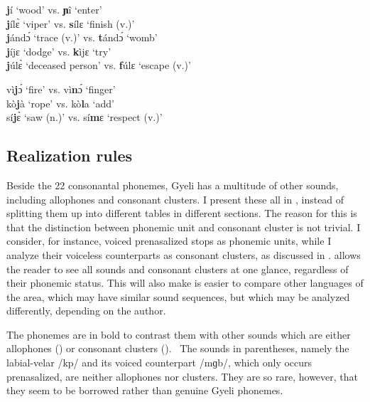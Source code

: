 \ea \label{j}
{\bfseries j}í `wood' vs. {\bfseries ɲ}î `enter' \\
{\bfseries j}ílɛ̀ `viper' vs. {\bfseries s}ílɛ `finish (v.)' \\
{\bfseries j}ándɔ́ `trace (v.)' vs. {\bfseries t}ándɔ́ `womb' \\
{\bfseries j}íjɛ `dodge' vs. {\bfseries k}ìjɛ `try' \\
{\bfseries j}úlɛ̀ `deceased person' vs. {\bfseries f}úlɛ `escape (v.)'
\z

\ea \label{jm}
vì{\bfseries j}ɔ́ `fire' vs. vì{\bfseries n}ɔ́ `finger' \\
 kò{\bfseries j}à `rope' vs. kò{\bfseries l}a `add' \\
sí{\bfseries j}ɛ̀ `saw (n.)' vs. sí{\bfseries m}ɛ `respect (v.)'
\z






\subsection{Realization rules}
\label{sec:Realization}

Beside the 22 consonantal phonemes, Gyeli has a multitude of other sounds, including allophones and consonant clusters. I present these all in , instead of splitting them up into different tables in different sections. The reason for this is that the distinction between phonemic unit and consonant cluster is not trivial. I consider, for instance, voiced prenasalized stops as phonemic units, while I analyze their voiceless counterparts as consonant clusters, as discussed in .   allows the reader to see all sounds and consonant clusters at one glance, regardless of their phonemic status. This will also make is easier to compare other languages of the area, which may have similar sound sequences, but which may be analyzed differently, depending on the author.

The phonemes are in bold to contrast them with other sounds which are either allophones () or consonant clusters ().%
\ The sounds in parentheses, namely the labial-velar /kp/ and its voiced counterpart /mɡb/, which only occurs prenasalized, are neither allophones nor clusters. They are so rare, however, that they seem to be borrowed rather than genuine Gyeli phonemes.

